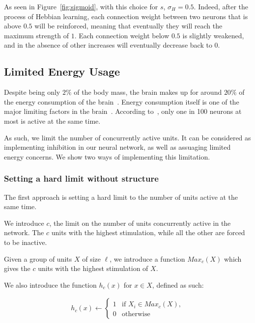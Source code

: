 \documentclass[journal]{IEEEtran}
\begin{document}
As seen in Figure~\ref{fig:sigmoid}, with this choice for $s$, $\sigma_H = 0.5$. Indeed, after the process of Hebbian learning, each connection weight between two neurons that is above $0.5$ will be reinforced, meaning that eventually they will reach the maximum strength of $1$. Each connection weight below $0.5$ is slightly weakened, and in the absence of other increases will eventually decrease back to $0$.

\subsection{Limited Energy Usage}

Despite being only $2\%$ of the body mass, the brain makes up for around $20\%$ of the energy consumption of the brain~\cite{lennie2003cost}. Energy consumption itself is one of the major limiting factors in the brain~\cite{attwell2001energy, lennie2003cost}. According to~\cite{attwell2001energy}, only one in 100 neurons at most is active at the same time. 

As such, we limit the number of concurrently active units. It can be considered as implementing inhibition in our neural network, as well as assuaging limited energy concerns. We show two ways of implementing this limitation.

\subsubsection{Setting a hard limit without structure}

The first approach is setting a hard limit to the number of units active at the same time.

We introduce $c$, the limit on the number of units concurrently active in the network. The $c$ units with the highest stimulation, while all the other are forced to be inactive.

Given a group of units $X$ of size $\ell$, we introduce a function $Max_c(X)$ which gives the $c$ units with the highest stimulation of $X$.

We also introduce the function $h_c(x)$ for $x \in X$, defined as such:

\begin{equation}
\begin{split}
h_c(x) \leftarrow \left\{\begin{array}{ll} 1 & \mbox {if } X_i \in Max_c(X), \\
 0 & \mbox {otherwise}\end{array}\right.
\end{split}
\end{equation}
\end{document}
